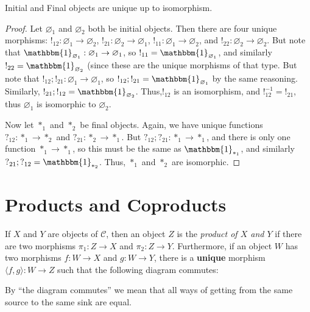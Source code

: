 \documentclass{lecturenotes}
\newcommand{\id}[1][]{\ensuremath{\mathbbm{1}_{#1}}}
\newcommand{\prodmor}[2]{\ensuremath{\langle #1, #2 \rangle}}
\begin{document}
\begin{thm}
  Initial and Final objects are unique up to isomorphism. 
\end{thm}
\begin{proof}
  Let $\varnothing_1$ and $\varnothing_2$ both be initial objects.
  Then there are four unique morphisms: $!_{12} : \varnothing_1 \to \varnothing_2$, $!_{21} : \varnothing_2 \to \varnothing_1$, $!_{11} : \varnothing_1 \to \varnothing_2$, and $!_{22} : \varnothing_2 \to \varnothing_2$.
  But note that $\id[\varnothing_1] : \varnothing_1 \to \varnothing_1$, so $!_{11} = \id[\varnothing_1]$, and similarly $!_{22} = \id[\varnothing_2]$ (since these are the unique morphisms of that type.
  But note that $!_{12}; !_{21} : \varnothing_1 \to \varnothing_1$, so $!_{12}; !_{21} = \id[\varnothing_1]$ by the same reasoning.
  Similarly, $!_{21}; !_{12} = \id[\varnothing_2]$.
  Thus,$ !_{12}$ is an isomorphism, and $!_{12}^{-1} = !_{21}$, thus $\varnothing_1$ is isomorphic to $\varnothing_2$.

  Now let $\ast_1$ and  $\ast_2$ be final objects.
  Again, we have unique functions $?_{12} : \ast_1 \to \ast_2$ and $?_{21} : \ast_2 \to \ast_1$.
  But $?_{12}; ?_{21} : \ast_1 \to \ast_1$, and there is only one function $\ast_1 \to \ast_1$, so this must be the same as $\id[\ast_1]$, and similarly $?_{21} ; ?_{12} = \id[\ast_2]$.
  Thus, $\ast_1$ and $\ast_2$ are isomorphic.  
\end{proof}

\section{Products and Coproducts}
\label{sec:products-coproducts}

\begin{defn}
  If $X$ and $Y$ are objects of $\mathcal{C}$, then an object $Z$ is the \emph{product of $X$ and $Y$} if there are two morphisms $\pi_1 : Z \to X$ and $\pi_2 : Z \to Y$.
  Furthermore, if an object $W$ has two morphisms $f : W \to X$ and $g : W \to Y$, there is a \textbf{unique} morphism $\langle f, g \rangle : W \to Z$ such that the following diagram commutes:
  \begin{center}
  \end{center}
  By ``the diagram commutes'' we mean that all ways of getting from the same source to the same sink are equal.
\end{defn}
\end{document}
